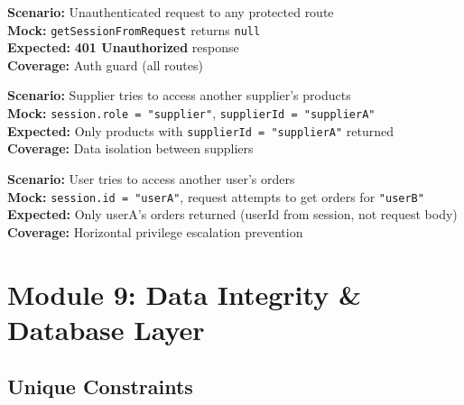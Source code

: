 \documentclass[12pt,a4paper]{report}
\newcommand{\pone}{\textbf{\color{p1red}P1}}
\begin{document}
\begin{tcolorbox}[criticalbox, title={RBAC-008 \hfill \pone\ --- Unauthenticated}]
\textbf{Scenario:} Unauthenticated request to any protected route \\
\textbf{Mock:} \texttt{getSessionFromRequest} returns \texttt{null} \\
\textbf{Expected:} \textbf{401 Unauthorized} response \\
\textbf{Coverage:} Auth guard (all routes)
\end{tcolorbox}

\begin{tcolorbox}[criticalbox, title={RBAC-010 \hfill \pone\ --- Data Isolation}]
\textbf{Scenario:} Supplier tries to access another supplier's products \\
\textbf{Mock:} \texttt{session.role = "supplier"}, \texttt{supplierId = "supplierA"} \\
\textbf{Expected:} Only products with \texttt{supplierId = "supplierA"} returned \\
\textbf{Coverage:} Data isolation between suppliers
\end{tcolorbox}

\begin{tcolorbox}[criticalbox, title={RBAC-011 \hfill \pone\ --- Horizontal Privilege Escalation}]
\textbf{Scenario:} User tries to access another user's orders \\
\textbf{Mock:} \texttt{session.id = "userA"}, request attempts to get orders for \texttt{"userB"} \\
\textbf{Expected:} Only userA's orders returned (userId from session, not request body) \\
\textbf{Coverage:} Horizontal privilege escalation prevention
\end{tcolorbox}


\chapter{Module 9: Data Integrity \& Database Layer}

\section{Unique Constraints}
\end{document}
